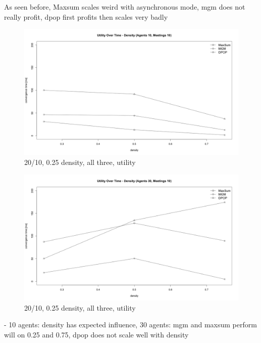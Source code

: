As seen before, Maxsum scales weird with asynchronous mode, mgm does not really profit, dpop first profits then scales very badly

\begin{figure}[H]
\centering
\includegraphics[width=430px]{graphics/experiments/static/st_17}
\caption{20/10, 0.25 density, all three, utility}
\label{fig:mgm_graph}
\end{figure}

\begin{figure}[H]
\centering
\includegraphics[width=430px]{graphics/experiments/static/st_18}
\caption{20/10, 0.25 density, all three, utility}
\label{fig:mgm_graph}
\end{figure}

- 10 agents: density has expected influence, 30 agents:  mgm and maxsum perform will on 0.25 and 0.75, dpop does not scale well with density

